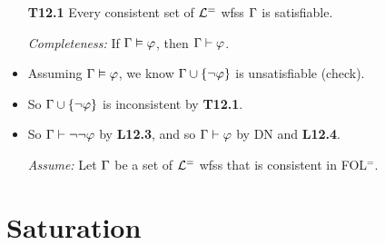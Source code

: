 \documentclass[a4paper, 11pt]{article} %
\begin{document}
\begin{itemize}
  \item[\bf T12.1] Every consistent set of $\mathcal{L}^=$ wfss $\Gamma$ is satisfiable.
  \item[\it Completeness:] If $\Gamma\vDash\varphi$, then $\Gamma\vdash\varphi$.
  \item Assuming $\Gamma\vDash\varphi$, we know $\Gamma\cup\lbrace\neg\varphi\rbrace$ is unsatisfiable (check).
  \item So $\Gamma\cup\lbrace\neg\varphi\rbrace$ is inconsistent by \textbf{T12.1}.
  \item So $\Gamma\vdash\neg\neg\varphi$ by \textbf{L12.3}, and so $\Gamma\vdash\varphi$ by DN and \textbf{L12.4}.
  \item[\it Assume:] Let $\Gamma$ be a set of $\mathcal{L}^=$ wfss that is consistent in FOL$^=$.
\end{itemize}




\section*{Saturation}
\end{document}
